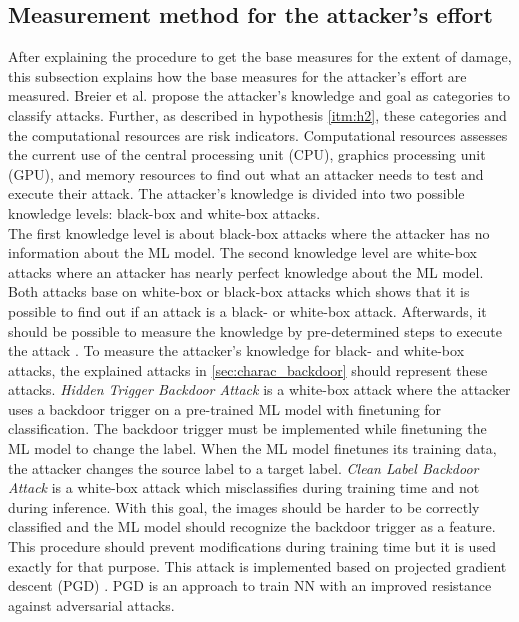 \subsection{Measurement method for the attacker's effort}
\label{sec:find_effort}

After explaining the procedure to get the base measures for the extent of damage, this subsection explains how the base measures for the attacker's effort are measured. Breier et al. \cite{DBLP:journals/corr/abs-2012-04884} propose the attacker's knowledge and goal as categories to classify attacks. Further, as described in hypothesis \ref{itm:h2}, these categories and the computational resources are risk indicators. Computational resources assesses the current use of the central processing unit (CPU), graphics processing unit (GPU), and memory resources to find out what an attacker needs to test and execute their attack. The attacker's knowledge is divided into two possible knowledge levels: black-box and white-box attacks. \\
The first knowledge level is about black-box attacks where the attacker has no information about the ML model.
The second knowledge level are white-box attacks where an attacker has nearly perfect knowledge about the ML model. Both attacks base on white-box or black-box attacks which shows that it is possible to find out if an attack is a black- or white-box attack. Afterwards, it should be possible to measure the knowledge by pre-determined steps to execute the attack \cite{bsi_2013}. To measure the attacker's knowledge for black- and white-box attacks, the explained attacks in \ref{sec:charac_backdoor} should represent these attacks. \textit{Hidden Trigger Backdoor Attack} \cite{DBLP:journals/corr/abs-1910-00033} is a white-box attack where the attacker uses a backdoor trigger on a pre-trained ML model with finetuning for classification. The backdoor trigger must be implemented while finetuning the ML model to change the label. When the ML model finetunes its training data, the attacker changes the source label to a target label. \textit{Clean Label Backdoor Attack} \cite{turner2018clean} is a white-box attack which misclassifies during training time and not during inference. With this goal, the images should be harder to be correctly classified and the ML model should recognize the backdoor trigger as a feature. This procedure should prevent modifications during training time but it is used exactly for that purpose. This attack is implemented based on projected gradient descent (PGD) \cite{DBLP:journals/corr/MadryMSTV17}. PGD is an approach to train NN with an improved resistance against adversarial attacks.
